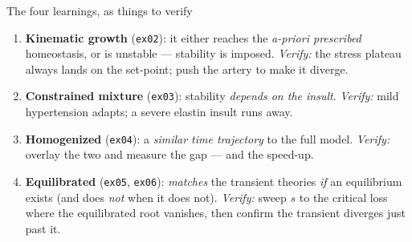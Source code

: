 \begin{frame}[t]{The four learnings, as things to verify}
  \begin{enumerate}
    \item \textbf{Kinematic growth} (\texttt{ex02}): it either reaches the
    \emph{a-priori prescribed} homeostasis, or is unstable --- stability is
    imposed. \emph{Verify:} the stress plateau always lands on the set-point;
    push the artery to make it diverge.
    \item \textbf{Constrained mixture} (\texttt{ex03}): stability
    \emph{depends on the insult}. \emph{Verify:} mild hypertension adapts; a
    severe elastin insult runs away.
    \item \textbf{Homogenized} (\texttt{ex04}): a \emph{similar time trajectory}
    to the full model. \emph{Verify:} overlay the two and measure the gap ---
    and the speed-up.
    \item \textbf{Equilibrated} (\texttt{ex05}, \texttt{ex06}): \emph{matches}
    the transient theories \emph{if} an equilibrium exists (and does \emph{not}
    when it does not). \emph{Verify:} sweep $s$ to the critical loss where the
    equilibrated root vanishes, then confirm the transient diverges just past it.
  \end{enumerate}
\end{frame}

